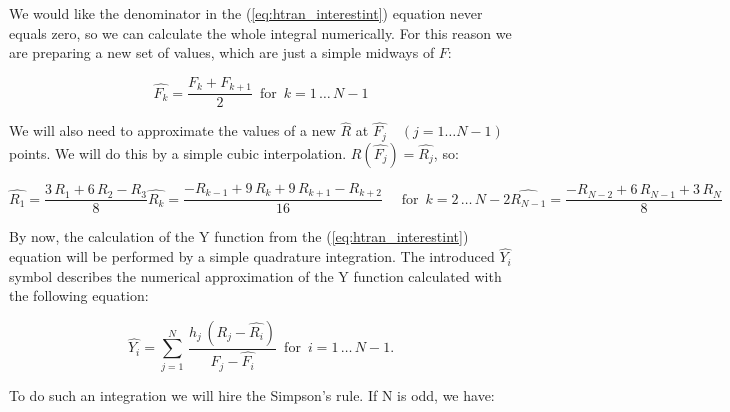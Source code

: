 \documentclass[12pt,twoside,a4paper]{article}
\numberwithin{equation}{subsection}
\numberwithin{figure}{subsection}
\begin{document}
We would like the denominator in the (\ref{eq:htran_interestint}) equation never equals zero, so we can calculate the whole integral
numerically. For this reason we are preparing a new set of values, which are just a simple midways of $F$:

\begin{equation} \label{eq:htran_newpoints}
  \widehat{F_k}=\frac { F_k + F_{k + 1} }{2} \,\mbox{ for } \, k = 1 \, \ldots \, {N - 1}
\end{equation} 

We will also need to approximate the values of a new $\widehat{R}$ at $\widehat{F_j} \quad (j = 1 \ldots N-1)$  points.
We will do this by a simple cubic interpolation. $R(\widehat{F_j}) = \widehat{R_j}$, so:

\begin{subequations} \label{eq:htran_r3interp}
  \begin{equation}   \label{eq:hr3inp_first}
    \widehat{R_1}     = \frac {3 \, R_1 + 6 \, R_2 - R_3}{8}
  \end{equation}
  \begin{equation}   \label{eq:hr3inp_next}
    \widehat{R_k}     = \frac { - R_{k - 1} + 9 \, R_k + 9 \, R_{k + 1} - R_{k + 2} }{16} 
                        \quad \mbox{ for } \, k = 2 \, \ldots \, {N - 2}
  \end{equation}
  \begin{equation}   \label{eq:hr3inp_last}
    \widehat{R_{N-1}} = \frac { - R_{N - 2} + 6 \, R_{N - 1} + 3 \, R_N}{8}
  \end{equation}
\end{subequations}

By now, the calculation of the $\mathrm{Y}$ function from the (\ref{eq:htran_interestint}) equation will be performed by a simple
quadrature integration. The introduced $\widehat{Y_{i}}$ symbol describes the numerical approximation of the $\mathrm{Y}$ function
calculated with the following equation:

\begin{equation} \label{eq:htran_simplequadrature}
  \widehat{Y_{i}} = \sum_{j=1}^{N} \, \frac {h_j \, (R_j - \widehat{R_i})} 
                                            {F_j - \widehat{F_i}} \, \mbox{ for } \, i = 1 \, \ldots \, {N - 1} .
\end{equation}

To do such an integration we will hire the Simpson's rule. If N is odd, we have:
\end{document}

